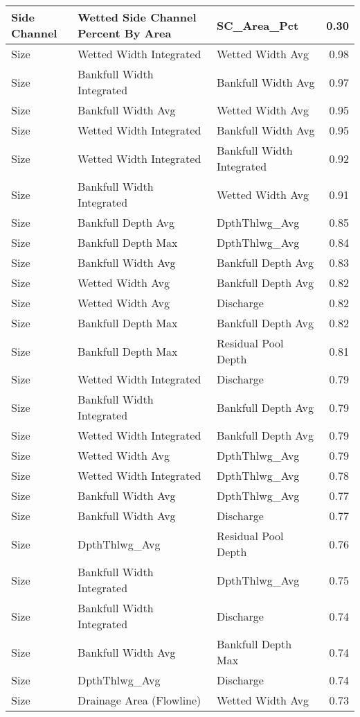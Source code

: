 \documentclass[
  12pt,
]{article}
\begin{document}
\begin{longtable}[t]{>{\raggedright\arraybackslash}p{1in}>{\raggedright\arraybackslash}p{2in}>{\raggedright\arraybackslash}p{2in}r}
Side Channel & Wetted Side Channel Percent By Area & SC\_Area\_Pct & 0.30\\
\hline
\addlinespace
Size & Wetted Width Integrated & Wetted Width Avg & 0.98\\
Size & Bankfull Width Integrated & Bankfull Width Avg & 0.97\\
Size & Bankfull Width Avg & Wetted Width Avg & 0.95\\
Size & Wetted Width Integrated & Bankfull Width Avg & 0.95\\
Size & Wetted Width Integrated & Bankfull Width Integrated & 0.92\\
\addlinespace
Size & Bankfull Width Integrated & Wetted Width Avg & 0.91\\
Size & Bankfull Depth Avg & DpthThlwg\_Avg & 0.85\\
Size & Bankfull Depth Max & DpthThlwg\_Avg & 0.84\\
Size & Bankfull Width Avg & Bankfull Depth Avg & 0.83\\
Size & Wetted Width Avg & Bankfull Depth Avg & 0.82\\
\addlinespace
Size & Wetted Width Avg & Discharge & 0.82\\
Size & Bankfull Depth Max & Bankfull Depth Avg & 0.82\\
Size & Bankfull Depth Max & Residual Pool Depth & 0.81\\
Size & Wetted Width Integrated & Discharge & 0.79\\
Size & Bankfull Width Integrated & Bankfull Depth Avg & 0.79\\
\addlinespace
Size & Wetted Width Integrated & Bankfull Depth Avg & 0.79\\
Size & Wetted Width Avg & DpthThlwg\_Avg & 0.79\\
Size & Wetted Width Integrated & DpthThlwg\_Avg & 0.78\\
Size & Bankfull Width Avg & DpthThlwg\_Avg & 0.77\\
Size & Bankfull Width Avg & Discharge & 0.77\\
\addlinespace
Size & DpthThlwg\_Avg & Residual Pool Depth & 0.76\\
Size & Bankfull Width Integrated & DpthThlwg\_Avg & 0.75\\
Size & Bankfull Width Integrated & Discharge & 0.74\\
Size & Bankfull Width Avg & Bankfull Depth Max & 0.74\\
Size & DpthThlwg\_Avg & Discharge & 0.74\\
\addlinespace
Size & Drainage Area (Flowline) & Wetted Width Avg & 0.73\\

\end{longtable}
\end{document}
